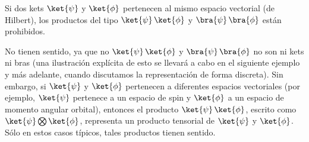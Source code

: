 \begin{enumerate}[label=\alph*)]
Si dos kets $\ket{\psi}$ y $\ket{\phi}$ pertenecen al mismo espacio vectorial (de Hilbert), los productos del tipo $\ket{\psi} \, \ket{\phi}$ y $\bra{\psi} \, \bra{\phi}$ están prohibidos.
\par
No tienen sentido, ya que no $\ket{\psi} \, \ket{\phi}$ y $\bra{\psi} \, \bra{\phi}$ no son ni kets ni bras (una ilustración explícita de esto se llevará a cabo en el siguiente ejemplo y más adelante, cuando discutamos la representación de forma discreta). Sin embargo, si $\ket{\psi}$ y $\ket{\phi}$ pertenecen a diferentes espacios vectoriales (por ejemplo, $\ket{\psi}$ pertenece a un espacio de spin y $\ket{\phi}$ a un espacio de momento angular orbital), entonces el producto $\ket{\psi} \, \ket{\phi}$, escrito como $\ket{\psi} \bigotimes \ket{\phi}$, representa un producto tensorial de $\ket{\psi}$ y $\ket{\phi}$. Sólo en estos casos típicos, tales productos tienen sentido.
\end{enumerate}
